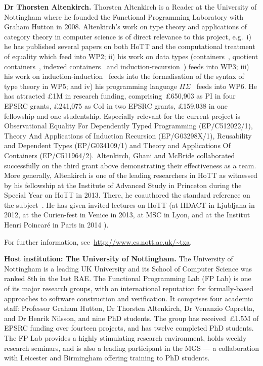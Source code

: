 \documentclass[a4paper,11pt]{article}
\newcommand{\eg}{{e.g.}\ }
\begin{document}
\newpage \textbf{Dr Thorsten Altenkirch.}  Thorsten Altenkirch is a
Reader at the University of Nottingham where he founded the Functional
Programming Laboratory with Graham Hutton in 2008. Altenkirch's
work on type theory and applications of category theory
in computer science is of direct relevance to this project, \eg i) he has
published several papers on both HoTT and the computational treatment
of equality
\cite{altenkirch:extSetoids,alti:ott-conf,alti:csl12,alti:tlca13-hedberg}
which feed into WP2; ii) his work on data types 
(containers~\cite{alti:cont-tcs}, quotient
containers~\cite{alti:mpc04}, indexed
containers~\cite{altenkirchGhaniHancockMcBrideMorris:indexedContainers}
and
induction-recursion~\cite{ghain:fibredIR})
feeds into WP3; iii) his work on
induction-induction~\cite{alti:catind2} feeds into the
formalisation of the syntax of type theory in WP5; and iv) his programming
language $\Pi\Sigma$~\cite{alti:pisigma-new} feeds into WP6. He
has attracted \pounds 1M in research funding,
comprising~\pounds650,903 as PI in four EPSRC grants, \pounds241,075
as CoI in two EPSRC grants, \pounds159,038 in one fellowship and one
studentship. Especially relevant for the current project is
Observational Equality For Dependently Typed Programming
(EP/C512022/1), Theory And Applications of Induction Recursion
(EP/G03298X/1), Reusability and Dependent Types (EP/G034109/1) and
Theory and Applications Of Containers (EP/C511964/2).  Altenkirch,
Ghani and McBride collaborated successfully on the third grant above
demonstrating their effectiveness as a team. More
generally, Altenkirch is one of the leading researchers in HoTT as
witnessed by his fellowship at the Institute of Advanced Study in
Princeton during the Special Year on HoTT in 2013. There, he
coauthored the standard reference on the subject~\cite{hott-book}.  He
has given invited lectures on HoTT (at HDACT in Ljubljana in 2012, at
the Curien-fest in Venice in 2013, at MSC in Lyon, and at the Institut
Henri Poincar\'e in Paris in 2014 \cite{txa-ihp14}).

For further information, see~\url{http://www.cs.nott.ac.uk/~txa}.

\textbf{Host institution: The University of Nottingham.}  The
University of Nottingham is a leading UK University 
and its School of Computer Science was ranked 8th in the last RAE. The Functional Programming Lab (FP Lab)
is one of its major research groups, with an international
reputation for formally-based approaches to software
construction and verification.  It comprises four
academic staff: Professor Graham Hutton, Dr Thorsten Altenkirch, Dr
Venanzio Capretta, and Dr Henrik Nilsson, and nine PhD students.
The group has received~\pounds1.5M of EPSRC funding over fourteen
projects, and has twelve completed PhD students.
The FP Lab provides a highly stimulating research environment,
holds weekly research seminars, and is also a leading participant in the MGS
--- a collaboration with Leicester and Birmingham offering training
to PhD students.
\noindent
\end{document}
